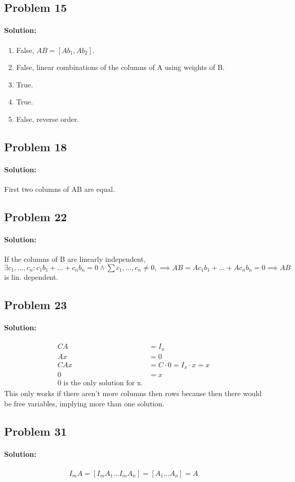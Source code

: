 \documentclass[11pt, notitlepage]{article}
\newenvironment{solution}{\paragraph{Solution:}}{\hfill}
\begin{document}
\subsection{Problem 15}
\begin{solution}
	\begin{enumerate}[label=\alph*.)]
		\item False, $AB=[Ab_1, Ab_2]$.
		\item False, linear combinations of the columns of A using weights of B.
		\item True.
		\item True.
		\item False, reverse order.
	\end{enumerate}
\end{solution}
\subsection{Problem 18}
\begin{solution}
	First two columns of AB are equal.
\end{solution}
\subsection{Problem 22}
\begin{solution}
	If the columns of B are linearly independent, $\exists c_1,...,c_n : c_1b_1+...+c_nb_n=0 \land \sum{c_1,...,c_n} \neq 0, \implies AB = Ac_1b_1+...+Ac_nb_n=0\implies AB$ is lin. dependent.
\end{solution}
\subsection{Problem 23}
\begin{solution}
	\begin{align*}
	CA&=I_x \\
	Ax&=0 \\
	CAx&=C\cdot 0=I_x\cdot x=x \\
	0&=x \\
	\text{0 is the only solution for x.} 
	\end{align*}
	This only works if there aren't more columns then rows because then there would be free variables, implying more than one solution.
	\end{solution}
\subsection{Problem 31}
\begin{solution}
	\begin{align*}
		I_mA=[I_mA_1 ... I_mA_n]=[A_1 ... A_n]=A
	\end{align*}
\end{solution}
\newpage
\end{document}
